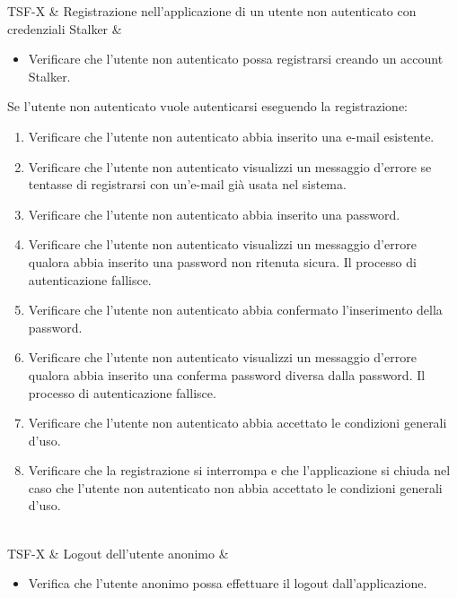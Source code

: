 TSF-X & Registrazione nell'applicazione di un utente non autenticato con credenziali Stalker & \begin{itemize}
    \item Verificare che l'utente non autenticato possa registrarsi creando un account Stalker.
\end{itemize}
Se l'utente non autenticato vuole autenticarsi eseguendo la registrazione:
\begin{enumerate}
    \item Verificare che l'utente non autenticato abbia inserito una e-mail esistente.
    \item Verificare che l'utente non autenticato visualizzi un messaggio d'errore se tentasse di registrarsi con un'e-mail già usata nel sistema.
    \item Verificare che l'utente non autenticato abbia inserito una password.
    \item Verificare che l'utente non autenticato visualizzi un messaggio d'errore qualora abbia inserito una password non ritenuta sicura. Il processo di autenticazione fallisce.
    \item Verificare che l'utente non autenticato abbia confermato l'inserimento della password.
    \item Verificare che l'utente non autenticato visualizzi un messaggio d'errore qualora abbia inserito una conferma password diversa dalla password. Il processo di autenticazione fallisce.
    \item Verificare che l'utente non autenticato abbia accettato le condizioni generali d'uso.
    \item Verificare che la registrazione si interrompa e che l'applicazione si chiuda nel caso che l'utente non autenticato non abbia accettato le condizioni generali d'uso.
\end{enumerate} \\

TSF-X & Logout dell'utente anonimo & \begin{itemize}
    \item Verifica che l'utente anonimo possa effettuare il logout dall'applicazione.
\end{itemize} \\


